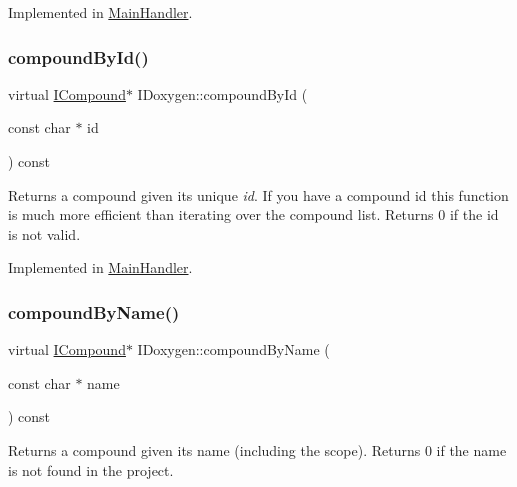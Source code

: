 Implemented in \mbox{\hyperlink{class_main_handler_a126390d35459251f392ebcd1cd659cda}{Main\+Handler}}.

\mbox{\label{class_i_doxygen_aec9e0df2a3c6a8085358ff0f07c52c55}} 
\subsubsection{\texorpdfstring{compoundById()}{compoundById()}\hspace{0.1cm}{\footnotesize\ttfamily [2/2]}}
{\footnotesize\ttfamily virtual \mbox{\hyperlink{class_i_compound}{I\+Compound}}$\ast$ I\+Doxygen\+::compound\+By\+Id (\begin{DoxyParamCaption}\item[{const char $\ast$}]{id }\end{DoxyParamCaption}) const\hspace{0.3cm}{\ttfamily [pure virtual]}}

Returns a compound given its unique {\itshape id}. If you have a compound id this function is much more efficient than iterating over the compound list. Returns 0 if the id is not valid. 

Implemented in \mbox{\hyperlink{class_main_handler_a126390d35459251f392ebcd1cd659cda}{Main\+Handler}}.

\mbox{\label{class_i_doxygen_a8da2fb55aad2aa941b2c529a5f1361aa}} 
\subsubsection{\texorpdfstring{compoundByName()}{compoundByName()}\hspace{0.1cm}{\footnotesize\ttfamily [1/2]}}
{\footnotesize\ttfamily virtual \mbox{\hyperlink{class_i_compound}{I\+Compound}}$\ast$ I\+Doxygen\+::compound\+By\+Name (\begin{DoxyParamCaption}\item[{const char $\ast$}]{name }\end{DoxyParamCaption}) const\hspace{0.3cm}{\ttfamily [pure virtual]}}

Returns a compound given its name (including the scope). Returns 0 if the name is not found in the project. 

